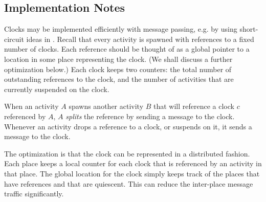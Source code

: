 \subsection{Implementation Notes}
Clocks may be implemented efficiently with message passing, e.g.{} by
using short-circuit ideas in \cite{SaraswatPODC88}.  Recall that every
activity is spawned with references to a fixed number of clocks. Each
reference should be thought of as a global pointer to a location in
some place representing the clock. (We shall discuss a further
optimization below.) Each clock keeps two counters: the total number
of outstanding references to the clock, and the number of activities
that are currently suspended on the clock.

When an activity $A$ spawns another activity $B$ that will reference a
clock $c$ referenced by $A$, $A$ {\em splits} the reference by sending
a message to the clock. Whenever an activity drops a reference to a
clock, or suspends on it, it sends a message to the clock. 

The optimization is that the clock can be represented in a distributed
fashion. Each place keeps a local counter for each clock that is
referenced by an activity in that place. The global location for the
clock simply keeps track of the places that have references and that
are quiescent. This can reduce the inter-place message traffic
significantly.
